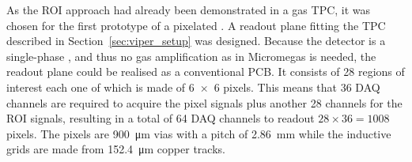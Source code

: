 As the ROI approach had already been demonstrated in a gas TPC, it was chosen for the first prototype of a pixelated \lartpc{}.
A readout plane fitting the TPC described in Section~\ref{sec:viper_setup} was designed.
Because the detector is a single-phase \lartpc{}, and thus no gas amplification as in Micromegas is needed, the readout plane could be realised as a conventional PCB.
It consists of \num{28} regions of interest each one of which is made of \num{6 x 6} pixels.
This means that \num{36} DAQ channels are required to acquire the pixel signals plus another \num{28} channels for the ROI signals, resulting in a total of \num{64} DAQ channels to readout $28 \times 36 = 1008$ pixels.
The pixels are \SI{900}{\micro\metre} vias with a pitch of \SI{2.86}{\milli\metre} while the inductive grids are made from \SI{152.4}{\micro\metre} copper tracks.